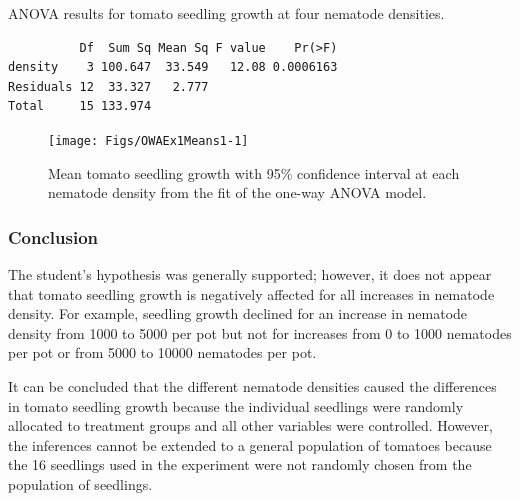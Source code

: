 \documentclass[10pt,openany]{book}\usepackage[]{graphicx}\usepackage[]{color}
\makeatletter
\newenvironment{kframe}{%
 \def\at@end@of@kframe{}%
 \ifinner\ifhmode%
  \def\at@end@of@kframe{\end{minipage}}%
  \begin{minipage}{\columnwidth}%
 \fi\fi%
 \def\FrameCommand##1{\hskip\@totalleftmargin \hskip-\fboxsep
 \colorbox{shadecolor}{##1}\hskip-\fboxsep
     \hskip-\linewidth \hskip-\@totalleftmargin \hskip\columnwidth}%
 \MakeFramed {\advance\hsize-\width
   \@totalleftmargin\z@ \linewidth\hsize
   \@setminipage}}%
 {\par\unskip\endMakeFramed%
 \at@end@of@kframe}
\newenvironment{knitrout}{}{} %
\makeatother
\begin{document}
\begin{table}[h]
  \centering
  \caption{ANOVA results for tomato seedling growth at four nematode densities.}\label{tab:OWAEx1ANOVA}
\begin{knitrout}
\color{fgcolor}\begin{kframe}
\begin{verbatim}
          Df  Sum Sq Mean Sq F value    Pr(>F)
density    3 100.647  33.549   12.08 0.0006163
Residuals 12  33.327   2.777                  
Total     15 133.974                          
\end{verbatim}
\end{kframe}
\end{knitrout}
\end{table}

\begin{knitrout}
\color{fgcolor}\begin{figure}[hbtp]

{\centering \texttt{[image: Figs/OWAEx1Means1-1]} 

}

\caption[Mean tomato seedling growth with 95\% confidence interval at each nematode density from the fit of the one-way ANOVA model]{Mean tomato seedling growth with 95\% confidence interval at each nematode density from the fit of the one-way ANOVA model.}\label{fig:OWAEx1Means1}
\end{figure}


\end{knitrout}

\subsubsection*{Conclusion}
The student's hypothesis was generally supported; however, it does not appear that tomato seedling growth is negatively affected for all increases in nematode density.  For example, seedling growth declined for an increase in nematode density from 1000 to 5000 per pot but not for increases from 0 to 1000 nematodes per pot or from 5000 to 10000 nematodes per pot.

It can be concluded that the different nematode densities caused the differences in tomato seedling growth because the individual seedlings were randomly allocated to treatment groups and all other variables were controlled.  However, the inferences cannot be extended to a general population of tomatoes because the 16 seedlings used in the experiment were not randomly chosen from the population of seedlings.
\end{document}
